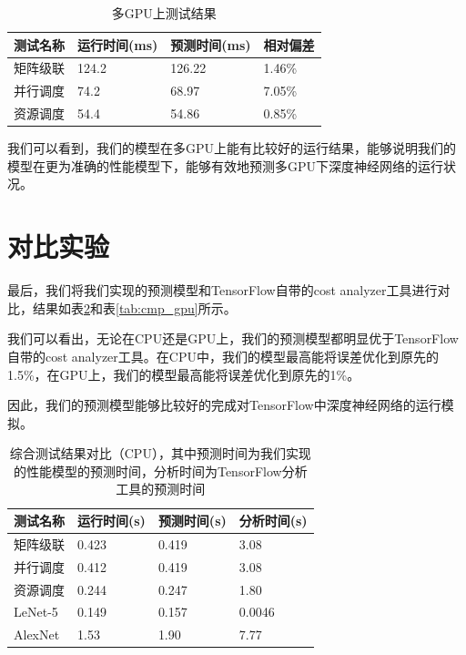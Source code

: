     \begin{table}[!htbp]
        \centering
	    \caption{多GPU上测试结果}
        \label{tab:mul_gpu}
        \begin{tabular}{|l|l|l|l|}
            \hline
            测试名称 & 运行时间(ms) & 预测时间(ms) & 相对偏差\\
            \hline
            矩阵级联 & 124.2 & 126.22 & 1.46\% \\
            \hline
            并行调度 & 74.2 & 68.97 & 7.05\% \\
            \hline
            资源调度 & 54.4 & 54.86 & 0.85\% \\
            \hline
        \end{tabular}
    \end{table}
    
    我们可以看到，我们的模型在多GPU上能有比较好的运行结果，能够说明我们的模型在更为准确的性能模型下，能够有效地预测多GPU下深度神经网络的运行状况。
    
\section{对比实验}
\label{sec:cmp}
    最后，我们将我们实现的预测模型和TensorFlow自带的cost analyzer工具进行对比，结果如表\ref{tab:cmp_cpu}和表\ref{tab:cmp_gpu}所示。
    
    我们可以看出，无论在CPU还是GPU上，我们的预测模型都明显优于TensorFlow自带的cost analyzer工具。在CPU中，我们的模型最高能将误差优化到原先的1.5\%，在GPU上，我们的模型最高能将误差优化到原先的1\%。
    
    因此，我们的预测模型能够比较好的完成对TensorFlow中深度神经网络的运行模拟。

    \begin{table}[!htbp]
        \centering
	    \caption{综合测试结果对比（CPU），其中预测时间为我们实现的性能模型的预测时间，分析时间为TensorFlow分析工具的预测时间}
        \label{tab:cmp_cpu}
        \begin{tabular}{|l|l|l|l|}
            \hline
            测试名称 & 运行时间(s) & 预测时间(s) & 分析时间(s)\\
            \hline
            矩阵级联 & 0.423 & 0.419 & 3.08 \\
            \hline
            并行调度 & 0.412 & 0.419 & 3.08 \\
            \hline
            资源调度 & 0.244 & 0.247 & 1.80 \\
            \hline
            LeNet-5 & 0.149 & 0.157 & 0.0046 \\
            \hline
            AlexNet & 1.53 & 1.90 & 7.77 \\
            \hline
        \end{tabular}
    \end{table}

